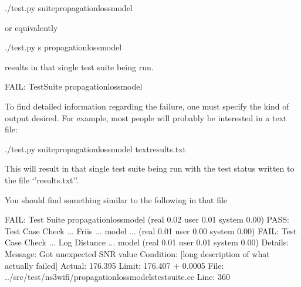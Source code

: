 \documentclass[letterpaper,10pt,english]{sphinxmanual}
\begin{document}
\begin{sphinxVerbatim}[commandchars=\\\{\}]
\PYGZdl{} ./test.py \PYGZhy{}\PYGZhy{}suitepropagation\PYGZhy{}loss\PYGZhy{}model
\end{sphinxVerbatim}

or equivalently

\begin{sphinxVerbatim}[commandchars=\\\{\}]
\PYGZdl{} ./test.py \PYGZhy{}s propagation\PYGZhy{}loss\PYGZhy{}model
\end{sphinxVerbatim}

results in that single test suite being run.

\begin{sphinxVerbatim}[commandchars=\\\{\}]
FAIL: TestSuite propagation\PYGZhy{}loss\PYGZhy{}model
\end{sphinxVerbatim}

To find detailed information regarding the failure, one must specify the kind
of output desired.  For example, most people will probably be interested in
a text file:

\begin{sphinxVerbatim}[commandchars=\\\{\}]
\PYGZdl{} ./test.py \PYGZhy{}\PYGZhy{}suitepropagation\PYGZhy{}loss\PYGZhy{}model \PYGZhy{}\PYGZhy{}textresults.txt
\end{sphinxVerbatim}

This will result in that single test suite being run with the test status written to
the file ‘’results.txt’’.

You should find something similar to the following in that file

\begin{sphinxVerbatim}[commandchars=\\\{\}]
FAIL: Test Suite \PYGZsq{}\PYGZsq{}propagation\PYGZhy{}loss\PYGZhy{}model\PYGZsq{}\PYGZsq{} (real 0.02 user 0.01 system 0.00)
PASS: Test Case \PYGZdq{}Check ... Friis ... model ...\PYGZdq{} (real 0.01 user 0.00 system 0.00)
FAIL: Test Case \PYGZdq{}Check ... Log Distance ... model\PYGZdq{} (real 0.01 user 0.01 system 0.00)
  Details:
    Message:   Got unexpected SNR value
    Condition: [long description of what actually failed]
    Actual:    176.395
    Limit:     176.407 +\PYGZhy{} 0.0005
    File:      ../src/test/ns3wifi/propagation\PYGZhy{}loss\PYGZhy{}models\PYGZhy{}test\PYGZhy{}suite.cc
    Line:      360
\end{sphinxVerbatim}
\end{document}
